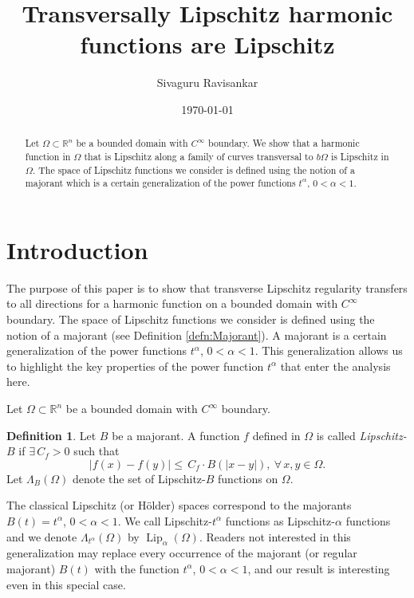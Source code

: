 \documentclass[12pt,a4paper]{amsart}
\numberwithin{equation}{section}
\theoremstyle{definition}
\newtheorem{definition}[equation]{Definition}
\begin{document}
\title{Transversally Lipschitz harmonic functions are Lipschitz}
\author{Sivaguru Ravisankar}
\address{Department of Mathematics, The Ohio State University, Columbus, Ohio 43210}
\date{\usdate\today}


\begin{abstract}
Let $\Omega\subset\mathbb{R}^n$ be a bounded domain with $C^\infty$ boundary. We show that a harmonic function in $\Omega$ that is Lipschitz along a family of curves transversal to $b\Omega$ 
is Lipschitz in $\Omega$.  The space of Lipschitz functions we consider is defined using the notion of a majorant which is a certain generalization of the power functions $t^\alpha$, $0<\alpha<1$.	
\end{abstract}

\maketitle

\section{Introduction}
The purpose of this paper is to show that transverse Lipschitz regularity transfers to all directions for a harmonic function on a bounded domain with $C^\infty$ boundary. The space of Lipschitz functions we 
consider is defined using the notion of a majorant (see Definition  \ref{defn:Majorant}). A majorant is a certain generalization of the power functions $t^\alpha$, $0<\alpha<1$. This generalization allows us to 
highlight the key properties of the power function $t^\alpha$ that enter the analysis here.

Let $\Omega\subset\mathbb{R}^n$ be a bounded domain with $C^\infty$ boundary.
\begin{definition} Let $B$ be a majorant. A function $f$ defined in $\Omega$ is called {\it Lipschitz-$B$} if $\exists\, C_f>0$ such that
\[{\left\lvert{f(x)-f(y)}\right\rvert} \le\, C_f\cdot B({\left\lvert{x-y}\right\rvert}), \ \forall\, x,y\in\Omega .\]
Let $\Lambda_B(\Omega)$ denote the set of Lipschitz-$B$ functions on $\Omega$.
\end{definition}
The classical Lipschitz (or H\"{o}lder) spaces correspond to the majorants $B(t)=t^{\alpha}$, $0<\alpha<1$. We 
call Lipschitz-$t^\alpha$ functions as Lipschitz-$\alpha$ functions and we denote $\Lambda_{t^\alpha}\left(\Omega\right)$ by $\operatorname{\operatorname{Lip}}_{\alpha}\left(\Omega\right)$. Readers not interested in this generalization may replace every occurrence of the majorant (or regular majorant) $B(t)$ with the function $t^\alpha$, $0<\alpha<1$, and our result is interesting even in this special case.
\end{document}
